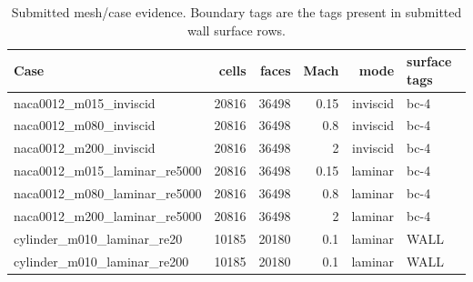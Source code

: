 \documentclass[11pt]{article}
\begin{document}
\begin{table}[htbp]\centering\scriptsize
\caption{Submitted mesh/case evidence. Boundary tags are the tags present in submitted wall surface rows.}\label{tab:mesh}
\begin{tabularx}{\linewidth}{lrrrrX}\toprule Case & cells & faces & Mach & mode & surface tags\\\midrule
naca0012\_m015\_inviscid & 20816 & 36498 & 0.15 & inviscid & bc-4 \\
naca0012\_m080\_inviscid & 20816 & 36498 & 0.8 & inviscid & bc-4 \\
naca0012\_m200\_inviscid & 20816 & 36498 & 2 & inviscid & bc-4 \\
naca0012\_m015\_laminar\_re5000 & 20816 & 36498 & 0.15 & laminar & bc-4 \\
naca0012\_m080\_laminar\_re5000 & 20816 & 36498 & 0.8 & laminar & bc-4 \\
naca0012\_m200\_laminar\_re5000 & 20816 & 36498 & 2 & laminar & bc-4 \\
cylinder\_m010\_laminar\_re20 & 10185 & 20180 & 0.1 & laminar & WALL \\
cylinder\_m010\_laminar\_re200 & 10185 & 20180 & 0.1 & laminar & WALL \\
\bottomrule\end{tabularx}\end{table}
\end{document}
